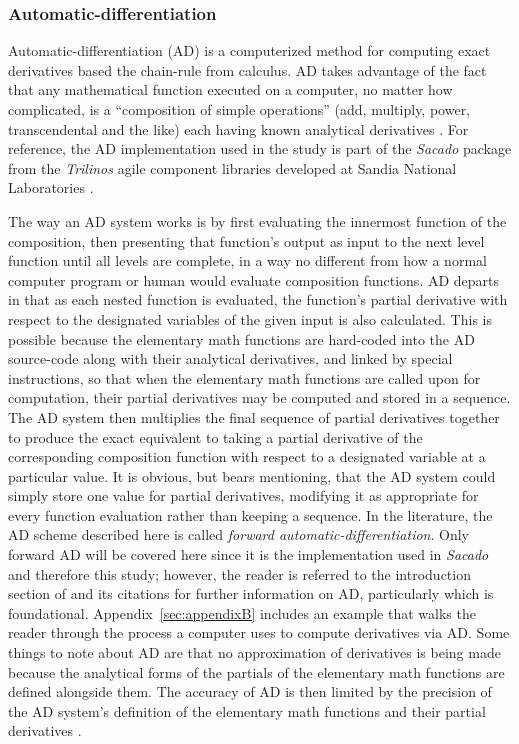 \documentclass[preprint,12pt]{elsarticle}
\begin{document}
\subsubsection{Automatic-differentiation} 
\label{ADsubsection}

Automatic-differentiation (AD) is a computerized method for computing exact derivatives based the chain-rule from calculus. AD takes advantage of the fact that any mathematical function executed on a computer, no matter how complicated, is a ``composition of simple operations'' (add, multiply, power, transcendental and the like) each having known analytical derivatives \cite{ref-sacado-presentation}. For reference, the AD implementation used in the study is part of the \emph{Sacado} package from the \emph{Trilinos} agile component libraries developed at Sandia National Laboratories \cite{ref-Sacado}.

The way an AD system works is by first evaluating the innermost function of the composition, then presenting that function's output as input to the next level function until all levels are complete, in a way no different from how a normal computer program or human would evaluate composition functions.  AD departs in that as each nested function is evaluated, the function's partial derivative with respect to the designated variables of the given input is also calculated.  This is possible because the elementary math functions are hard-coded into the AD source-code along with their analytical derivatives, and linked by special instructions, so that when the elementary math functions are called upon for computation, their partial derivatives may be computed and stored in a sequence. The AD system then multiplies the final sequence of partial derivatives together to produce the exact equivalent to taking a partial derivative of the corresponding composition function with respect to a designated variable at a particular value. It is obvious, but bears mentioning, that the AD system could simply store one value for partial derivatives, modifying it as appropriate for every function evaluation rather than keeping a sequence.  In the literature, the AD scheme described here is called \emph{forward automatic-differentiation}. Only forward AD will be covered here since it is the implementation used in \emph{Sacado} and therefore this study; however, the reader is referred to the introduction section of \cite{ref-AD-methods} and its citations for further information on AD, particularly \cite{ref-on-AD} which is foundational. Appendix~\ref{sec:appendixB} includes an example that walks the reader through the process a computer uses to compute derivatives via AD.  Some things to note about AD are that no approximation of derivatives is being made because the analytical forms of the partials of the elementary math functions are defined alongside them. The accuracy of AD is then limited by the precision of the AD system's definition of the elementary math functions and their partial derivatives .
 
\end{document}
